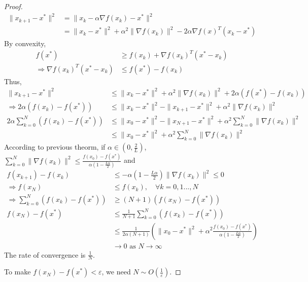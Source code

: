 \documentclass[11pt]{elegantbook}
\begin{document}
\begin{proof}
\begin{equation}
    \begin{aligned}
        \|x_{k+1}-x^*\|^2&=\|x_k-\alpha \nabla f(x_k)-x^*\|^2\\
        &=\|x_k-x^*\|^2+\alpha^2\|\nabla f(x_k)\|^2-2\alpha \nabla f(x)^T(x_k-x^*)
    \end{aligned}
    \nonumber
\end{equation}
By convexity,
\begin{equation}
    \begin{aligned}
        f(x^*)&\geq f(x_k)+\nabla f(x_k)^T(x^*-x_k)\\
        \Rightarrow	\nabla f(x_k)^T(x^*-x_k)&\leq f(x^*)-f(x_k)
    \end{aligned}
    \nonumber
\end{equation}
Thus,
\begin{equation}
    \begin{aligned}
        \|x_{k+1}-x^*\|^2&\leq \|x_k-x^*\|^2+\alpha^2\|\nabla f(x_k)\|^2+2\alpha (f(x^*)-f(x_k))\\
        \Rightarrow 2\alpha (f(x_k)-f(x^*))&\leq \|x_k-x^*\|^2-\|x_{k+1}-x^*\|^2+\alpha^2\|\nabla f(x_k)\|^2\\
        2\alpha\sum_{k=0}^N (f(x_k)-f(x^*))&\leq \|x_0-x^*\|^2-\|x_{N+1}-x^*\|^2+\alpha^2\sum_{k=0}^N\|\nabla f(x_k)\|^2\\
        &\leq \|x_0-x^*\|^2+\alpha^2\sum_{k=0}^N\|\nabla f(x_k)\|^2
    \end{aligned}
    \nonumber
\end{equation}
According to previous theorm, if $\alpha\in (0,\frac{2}{L})$, $\sum_{k=0}^N\|\nabla f(x_k)\|^2\leq \frac{f(x_0)-f(x^*)}{\alpha(1-\frac{L\alpha}{2})}$ and
\begin{equation}
    \begin{aligned}
        f(x_{k+1})-f(x_k)&\leq-\alpha (1-\frac{L\alpha}{2})\|\nabla f(x_k)\|^2\leq 0\\
        \Rightarrow	f(x_N)&\leq f(x_k),\quad \forall k=0,1...,N\\
        \Rightarrow	\sum_{k=0}^N(f(x_k)-f(x^*))&\geq (N+1)(f(x_N)-f(x^*))\\
        f(x_N)-f(x^*)&\leq \frac{1}{N+1}\sum_{k=0}^N(f(x_k)-f(x^*))\\
        &\leq \frac{1}{2\alpha(N+1)}(\|x_0-x^*\|^2+\alpha^2\frac{f(x_0)-f(x^*)}{\alpha(1-\frac{L\alpha}{2})})\\
        &\rightarrow 0 \text{ as }N \rightarrow	\infty
    \end{aligned}
    \nonumber
\end{equation}
The rate of convergence is $\frac{1}{N}$.

To make $f(x_N)-f(x^*)<\varepsilon$, we need $N\sim O(\frac{1}{\varepsilon})$.
\end{proof}
\end{document}
